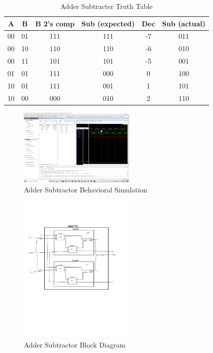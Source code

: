 \documentclass[11pt]{article}
\begin{document}
\begin{table}[h]\centering
	\caption{Adder Subtracter Truth Table }
	\label{tbl:example_table}
	\begin{tabular}{cc|ccc|c}
		\toprule
		A & B & B 2's comp & Sub (expected) & Dec & Sub (actual) \\
		\midrule
		00 & 01 & 111 & 111 & -7 & 011 \\
		00 & 10 & 110 & 110 & -6 & 010 \\
		00 & 11 & 101 & 101 & -5 & 001 \\
		01 & 01 & 111 & 000 & 0 & 100  \\
		10 & 01 & 111 & 001 & 1 & 101  \\
		10 & 00 & 000 & 010 & 2 & 110  \\
		\bottomrule
	\end{tabular} 
\end{table}

\begin{figure}[h]\centering
	\includegraphics[width=0.5\textwidth,trim=43cm 30cm 0cm 8cm,clip]{addsub sim}
	\caption{Adder Subtractor Behavioral Simulation}
\end{figure}

\begin{figure}[h]\centering
	\includegraphics[width=0.5\textwidth,trim=0cm 20cm 0cm 10cm,clip]{addsub block diagram}
	\caption{Adder Subtractor Block Diagram}
\end{figure}
\end{document}
